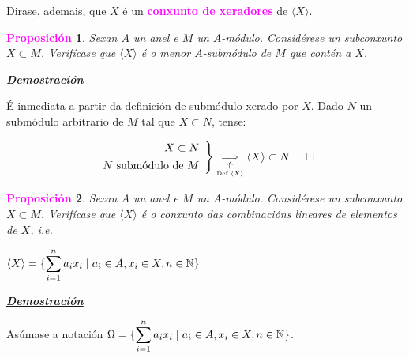 \documentclass[twoside]{report}
\newcommand{\magbf}[1]{\textcolor{magenta}{\textbf{#1}}} %
\theoremstyle{mystyle}
\newtheorem{prop}{\magbf{Proposición}}[chapter]
\newenvironment{proposition}
{\begin{mdframed}[linecolor = magenta,backgroundcolor = classicrose, linewidth = 2mm]\begin{prop}}
{\end{prop}\end{mdframed}}
\begin{document}
\noindent Dirase, ademais, que $X$ é un \magbf{conxunto de xeradores} de $\langle X \rangle$.\\

\begin{proposition} \label{prop3.2}
Sexan $A$ un anel e $M$ un $A$-módulo. Considérese un subconxunto $X \subset M$. Verifícase que $\langle X \rangle$ é o menor $A$-submódulo de $M$ que contén a $X$.
\end{proposition}

\vspace{2mm}

\noindent \textbf{\textit{\underline{Demostración}}}

\vspace{2mm}

\noindent É inmediata a partir da definición de submódulo xerado por $X$. Dado $N$ un submódulo arbitrario de $M$ tal que $X \subset N$, tense:

    \[ 
    \left. \begin{array}{r} 
    X \subset N  \\[1ex]
    N \text{ submódulo de } M
    \end{array} \right\} 
    \underset{\underset{\text{Def } \langle X \rangle}{\Uparrow}}{\implies} \langle X \rangle \subset N \hspace{5mm} \square
    \]
  
\begin{proposition} \label{prop3.3}
Sexan $A$ un anel e $M$ un $A$-módulo. Considérese un subconxunto $X \subset M$. Verifícase que $\langle X \rangle$ é o conxunto das combinacións lineares de elementos de $X$, i.e. 
\begin{center}
$\langle X \rangle = \{\displaystyle \sum_{i = 1}^{n}a_{i}x_{i} \hspace{1mm} | \hspace{1mm} a_{i} \in A, x_{i} \in X, n \in \mathbb{N}\}$
\end{center}
\end{proposition} 

\vspace{2mm}

\noindent \textbf{\textit{\underline{Demostración}}}

\vspace{2mm}

\noindent Asúmase a notación $\Omega = \{\displaystyle \sum_{i = 1}^{n}a_{i}x_{i} \hspace{1mm} | \hspace{1mm} a_{i} \in A, x_{i} \in X, n \in \mathbb{N}\}$. \\
\end{document}
